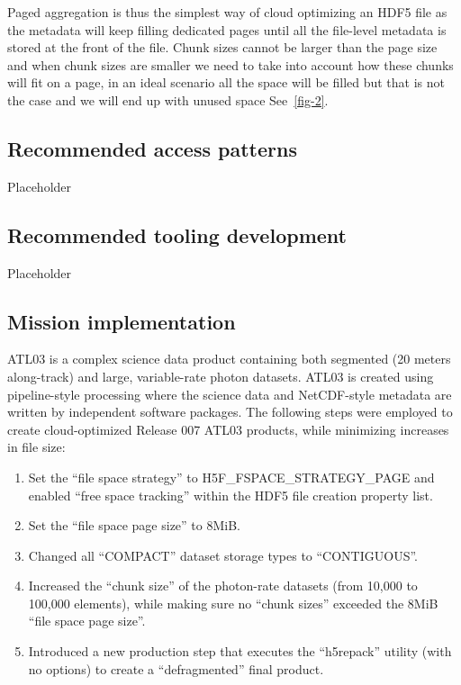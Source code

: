 \documentclass[
]{agujournal2019}
\providecommand{\tightlist}{%
  \setlength{\itemsep}{0pt}\setlength{\parskip}{0pt}}\usepackage{longtable,booktabs,array}
\begin{document}
Paged aggregation is thus the simplest way of cloud optimizing an HDF5
file as the metadata will keep filling dedicated pages until all the
file-level metadata is stored at the front of the file. Chunk sizes
cannot be larger than the page size and when chunk sizes are smaller we
need to take into account how these chunks will fit on a page, in an
ideal scenario all the space will be filled but that is not the case and
we will end up with unused space See~\ref{fig-2}.

\subsection{Recommended access
patterns}\label{recommended-access-patterns}

Placeholder

\subsection{Recommended tooling
development}\label{recommended-tooling-development}

Placeholder

\subsection{Mission implementation}\label{mission-implementation}

ATL03 is a complex science data product containing both segmented (20
meters along-track) and large, variable-rate photon datasets. ATL03 is
created using pipeline-style processing where the science data and
NetCDF-style metadata are written by independent software packages. The
following steps were employed to create cloud-optimized Release 007
ATL03 products, while minimizing increases in file size:

\begin{enumerate}
\def\labelenumi{\arabic{enumi}.}
\tightlist
\item
  Set the ``file space strategy'' to H5F\_FSPACE\_STRATEGY\_PAGE and
  enabled ``free space tracking'' within the HDF5 file creation property
  list.
\item
  Set the ``file space page size'' to 8MiB.
\item
  Changed all ``COMPACT'' dataset storage types to ``CONTIGUOUS''.
\item
  Increased the ``chunk size'' of the photon-rate datasets (from 10,000
  to 100,000 elements), while making sure no ``chunk sizes'' exceeded
  the 8MiB ``file space page size''.
\item
  Introduced a new production step that executes the ``h5repack''
  utility (with no options) to create a ``defragmented'' final product.
\end{enumerate}
\end{document}
